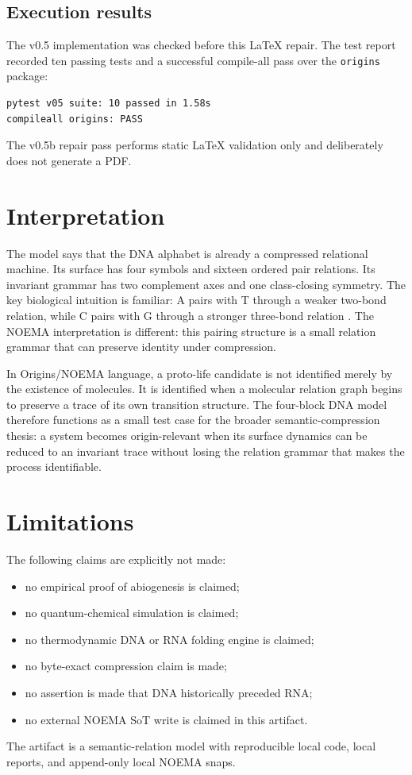 \documentclass[11pt]{article}
\begin{document}
\subsection{Execution results}
The v0.5 implementation was checked before this LaTeX repair. The test report recorded ten passing tests and a successful compile-all pass over the \texttt{origins} package:
\begin{verbatim}
pytest v05 suite: 10 passed in 1.58s
compileall origins: PASS
\end{verbatim}
The v0.5b repair pass performs static LaTeX validation only and deliberately does not generate a PDF.

\section{Interpretation}
The model says that the DNA alphabet is already a compressed relational machine. Its surface has four symbols and sixteen ordered pair relations. Its invariant grammar has two complement axes and one class-closing symmetry. The key biological intuition is familiar: A pairs with T through a weaker two-bond relation, while C pairs with G through a stronger three-bond relation \cite{WatsonCrick1953}. The NOEMA interpretation is different: this pairing structure is a small relation grammar that can preserve identity under compression.

In Origins/NOEMA language, a proto-life candidate is not identified merely by the existence of molecules. It is identified when a molecular relation graph begins to preserve a trace of its own transition structure. The four-block DNA model therefore functions as a small test case for the broader semantic-compression thesis: a system becomes origin-relevant when its surface dynamics can be reduced to an invariant trace without losing the relation grammar that makes the process identifiable.

\section{Limitations}
The following claims are explicitly not made:
\begin{itemize}[leftmargin=2em]
  \item no empirical proof of abiogenesis is claimed;
  \item no quantum-chemical simulation is claimed;
  \item no thermodynamic DNA or RNA folding engine is claimed;
  \item no byte-exact compression claim is made;
  \item no assertion is made that DNA historically preceded RNA;
  \item no external NOEMA SoT write is claimed in this artifact.
\end{itemize}
The artifact is a semantic-relation model with reproducible local code, local reports, and append-only local NOEMA snaps.
\end{document}
